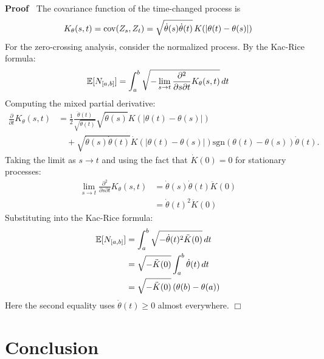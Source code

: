 \documentclass{article}
\newenvironment{proof}{\noindent\textbf{Proof\ }}{\hspace*{\fill}$\Box$\medskip}
\begin{document}
\begin{proof}
The covariance function of the time-changed process is
\begin{equation}
\label{eq:time_changed_cov} K_{\theta} (s, t) = \mathrm{cov} (Z_s, Z_t) =
\sqrt{\dot{\theta} (s) \dot{\theta} (t)} \hspace{0.17em} K (| \theta (t)
- \theta (s) |)
\end{equation}
For the zero-crossing analysis, consider the normalized process. By the
Kac-Rice formula:
\begin{equation}
\label{eq:kac_rice} \mathbb{E} [N_{[a, b]}] = \int_a^b \sqrt{- \lim_{s \to
t} \frac{\partial^2}{\partial s \partial t} K_{\theta} (s, t)}
\hspace{0.17em} dt
\end{equation}
Computing the mixed partial derivative:
\begin{align}
\frac{\partial}{\partial t} K_{\theta} (s, t) & = \frac{1}{2}
\frac{\ddot{\theta} (t)}{\sqrt{\dot{\theta} (t)}} \sqrt{\dot{\theta} (s)} K (|
\theta (t) - \theta (s) |) \\
& \quad + \sqrt{\dot{\theta} (s) \dot{\theta} (t)} \dot{K} (| \theta
(t) - \theta (s) |) \mathrm{sgn} (\theta (t) - \theta (s)) \dot{\theta}
(t) .
\end{align}
Taking the limit as $s \to t$ and using the fact that $\dot{K} (0) = 0$ for
stationary processes:
\begin{align}
\lim_{s \to t} \frac{\partial^2}{\partial s \partial t} K_{\theta} (s, t)
& = \dot{\theta} (s) \dot{\theta} (t) \ddot{K} (0) \\
& = \dot{\theta} (t)^2 \ddot{K} (0)
\end{align}
Substituting into the Kac-Rice formula:
\begin{align}
\mathbb{E} [N_{[a, b]}] & = \int_a^b \sqrt{- \dot{\theta} (t)^2 \ddot{K}
(0)} \hspace{0.17em} dt \\
& = \sqrt{- \ddot{K} (0)} \int_a^b \dot{\theta} (t) \hspace{0.17em} dt
\\
& = \sqrt{- \ddot{K} (0)} \hspace{0.17em} (\theta (b) - \theta (a))
\end{align}
Here the second equality uses $\dot{\theta} (t) \geq 0$ almost everywhere.
\end{proof}

\section{Conclusion}\label{sec:conclusion}
\end{document}
